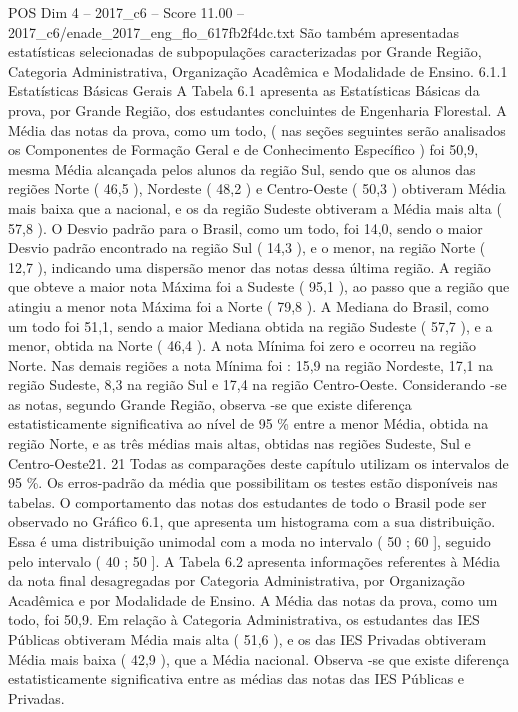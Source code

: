 \begin{textsample}{POS Dim 4 – 2017\_c6 – Score 11.00 – 2017\_c6/enade\_2017\_eng\_flo\_617fb2f4dc.txt}
São também apresentadas estatísticas selecionadas de subpopulações caracterizadas por Grande Região, Categoria Administrativa, Organização Acadêmica e Modalidade de Ensino. 6.1.1 Estatísticas Básicas Gerais A Tabela 6.1 apresenta as Estatísticas Básicas da prova, por Grande Região, dos estudantes concluintes de Engenharia Florestal.
A Média das notas da prova, como um todo, ( nas seções seguintes serão analisados os Componentes de Formação Geral e de Conhecimento Específico ) foi 50,9, mesma Média alcançada pelos alunos da região Sul, sendo que os alunos das regiões Norte ( 46,5 ), Nordeste ( 48,2 ) e Centro-Oeste ( 50,3 ) obtiveram Média mais baixa que a nacional, e os da região Sudeste obtiveram a Média mais alta ( 57,8 ).
O Desvio padrão para o Brasil, como um todo, foi 14,0, sendo o maior Desvio padrão encontrado na região Sul ( 14,3 ), e o menor, na região Norte ( 12,7 ), indicando uma dispersão menor das notas dessa última região.
A região que obteve a maior nota Máxima foi a Sudeste ( 95,1 ), ao passo que a região que atingiu a menor nota Máxima foi a Norte ( 79,8 ).
A Mediana do Brasil, como um todo foi 51,1, sendo a maior Mediana obtida na região Sudeste ( 57,7 ), e a menor, obtida na Norte ( 46,4 ).
A nota Mínima foi zero e ocorreu na região Norte.
Nas demais regiões a nota Mínima foi : 15,9 na região Nordeste, 17,1 na região Sudeste, 8,3 na região Sul e 17,4 na região Centro-Oeste.
Considerando -se as notas, segundo Grande Região, observa -se que existe diferença estatisticamente significativa ao nível de 95 \% entre a menor Média, obtida na região Norte, e as três médias mais altas, obtidas nas regiões Sudeste, Sul e Centro-Oeste21. 21 Todas as comparações deste capítulo utilizam os intervalos de 95 \%.
Os erros-padrão da média que possibilitam os testes estão disponíveis nas tabelas.
O comportamento das notas dos estudantes de todo o Brasil pode ser observado no Gráfico 6.1, que apresenta um histograma com a sua distribuição.
Essa é uma distribuição unimodal com a moda no intervalo ( 50 ; 60 ], seguido pelo intervalo ( 40 ; 50 ].
A Tabela 6.2 apresenta informações referentes à Média da nota final desagregadas por Categoria Administrativa, por Organização Acadêmica e por Modalidade de Ensino.
A Média das notas da prova, como um todo, foi 50,9.
Em relação à Categoria Administrativa, os estudantes das IES Públicas obtiveram Média mais alta ( 51,6 ), e os das IES Privadas obtiveram Média mais baixa ( 42,9 ), que a Média nacional.
Observa -se que existe diferença estatisticamente significativa entre as médias das notas das IES Públicas e Privadas.

\end{textsample}
